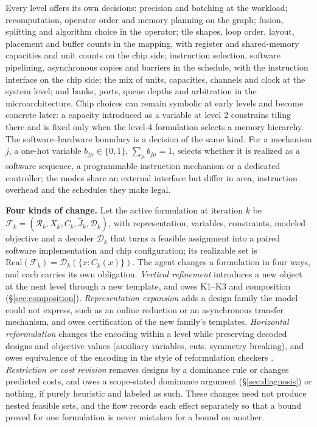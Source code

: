 \documentclass[11pt]{article}
\begin{document}
Every level offers its own decisions: precision and batching at the workload; recomputation, operator order and memory planning on the graph; fusion, splitting and algorithm choice in the operator; tile shapes, loop order, layout, placement and buffer counts in the mapping, with register and shared-memory capacities and unit counts on the chip side; instruction selection, software pipelining, asynchronous copies and barriers in the schedule, with the instruction interface on the chip side; the mix of units, capacities, channels and clock at the system level; and banks, ports, queue depths and arbitration in the microarchitecture. Chip choices can remain symbolic at early levels and become concrete later: a capacity introduced as a variable at level 2 constrains tiling there and is fixed only when the level-4 formulation selects a memory hierarchy. The software--hardware boundary is a decision of the same kind. For a mechanism \(j\), a one-hot variable \(b_{j\mu}\in\{0,1\}\), \(\sum_\mu b_{j\mu}=1\), selects whether it is realized as a software sequence, a programmable instruction mechanism or a dedicated controller; the modes share an external interface but differ in area, instruction overhead and the schedules they make legal.

\textbf{Four kinds of change.} Let the active formulation at iteration \(k\) be \(\mathcal F_k=(\mathcal R_k,X_k,C_k,\hat J_k,\mathcal D_k)\), with representation, variables, constraints, modeled objective and a decoder \(\mathcal D_k\) that turns a feasible assignment into a paired software implementation and chip configuration; its realizable set is \(\mathrm{Real}(\mathcal F_k)=\mathcal D_k(\{x: C_k(x)\})\). The agent changes a formulation in four ways, and each carries its own obligation. \emph{Vertical refinement} introduces a new object at the next level through a new template, and owes K1--K3 and composition (§\ref{sec:composition}). \emph{Representation expansion} adds a design family the model could not express, such as an online reduction or an asynchronous transfer mechanism, and owes certification of the new family's templates. \emph{Horizontal reformulation} changes the encoding within a level while preserving decoded designs and objective values (auxiliary variables, cuts, symmetry breaking), and owes equivalence of the encoding in the style of reformulation checkers \cite{r11,r14}. \emph{Restriction or cost revision} removes designs by a dominance rule or changes predicted costs, and owes a scope-stated dominance argument (§\ref{sec:diagnosis}) or nothing, if purely heuristic and labeled as such. These changes need not produce nested feasible sets, and the flow records each effect separately so that a bound proved for one formulation is never mistaken for a bound on another.
\end{document}
